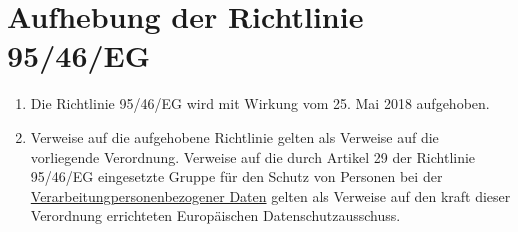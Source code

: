 \chapter{Aufhebung der Richtlinie 95/46/EG}
\label{ch:94}


\begin{enumerate}

  \item Die Richtlinie 95/46/EG wird mit Wirkung vom 25. Mai 2018 aufgehoben.%
  \label{itm:94-1}

  \item Verweise auf die aufgehobene Richtlinie gelten als Verweise auf die vorliegende Verordnung. Verweise auf die
   durch Artikel 29 der Richtlinie 95/46/EG
   eingesetzte Gruppe für den Schutz von Personen bei der \hyperref[itm:04-2]{Verarbeitung}\hyperref[itm:04-1]
   {personenbezogener Daten} gelten als Verweise auf den kraft dieser Verordnung errichteten Europäischen
   Datenschutzausschuss.%
  \label{itm:94-2}

\end{enumerate}



